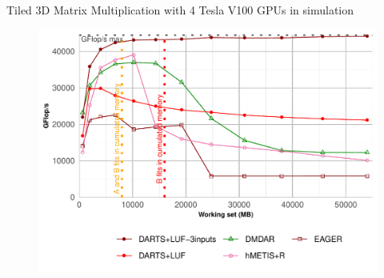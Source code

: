 \documentclass{libs/ufc_format}
\begin{document}
{%
\begin{frame}[noframenumbering]{Tiled 3D Matrix Multiplication with 4 Tesla V100 GPUs in simulation}
    \begin{figure}
        \centering
        \includegraphics[scale=0.5]{Images/GF_dynamic_data_aware_no_hfp_gemini-1-fgcs_4GPU_M3D.pdf}
    \end{figure}
\end{frame}

}
\end{document}
